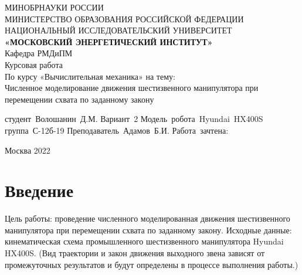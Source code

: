 \documentclass[a4paper]{article}
\begin{document}
	
	\begin{center}
		\hfill \break
		\large{МИНОБРНАУКИ РОССИИ}\\
		\footnotesize{МИНИСТЕРСТВО ОБРАЗОВАНИЯ РОССИЙСКОЙ ФЕДЕРАЦИИ}\\ 
		\footnotesize{НАЦИОНАЛЬНЫЙ ИССЛЕДОВАТЕЛЬСКИЙ УНИВЕРСИТЕТ}\\
		\small{\textbf{«МОСКОВСКИЙ ЭНЕРГЕТИЧЕСКИЙ ИНСТИТУТ»}}\\
		\hfill \break
		\normalsize{Кафедра РМДиПМ}\\
		\hfill \break
		\hfill\break
		\hfill\break
		\hfill \break
		\hfill \break
		\hfill \break
		\normalsize{Курсовая работа}\\
		\normalsize{По курсу «Вычислительная механика» на тему:}\\
		\normalsize{Численное моделирование движения шестизвенного манипулятора при перемещении схвата по заданному закону}\\
		\hfill \break
		\hfill \break
		\hfill \break
		
		\hfill \break
		
		\hfill \break
		\hfill \break
	\end{center}
	\hfill \break
	\hfill \break
	\hfill \break
	
	
	\hfill \break
	\vbox{%
		\hfill%
		\vbox{%
			\hbox{студент Волошанин Д.М.}%
			\hbox{Вариант 2}%
			\hbox{Модель робота Hyundai HX400S}%
			\hbox{группа С-12б-19}%
			\hbox{Преподаватель Адамов Б.И.}%
			\hbox{Работа зачтена: }%
		}%
	} 
	\hfill \break
	\hfill \break
	
	
	\hfill \break
	\hfill \break
	\begin{center} Москва 2022 \end{center}
	\thispagestyle{empty} %
	
	
	\newpage
	
	\tableofcontents %
	\newpage
	
	\newpage
	\section{Введение}
	Цель работы: проведение численного моделированная движения шестизвенного
	манипулятора при перемещении схвата по заданному закону.
	\hfill \break
	\hfill \break
	Исходные данные: кинематическая схема промышленного шестизвенного манипулятора Hyundai HX400S. 
	(Вид траектории и закон движения выходного звена зависят от промежуточных
	результатов и будут определены в процессе выполнения работы.)
	\hfill \break
	
\end{document}
